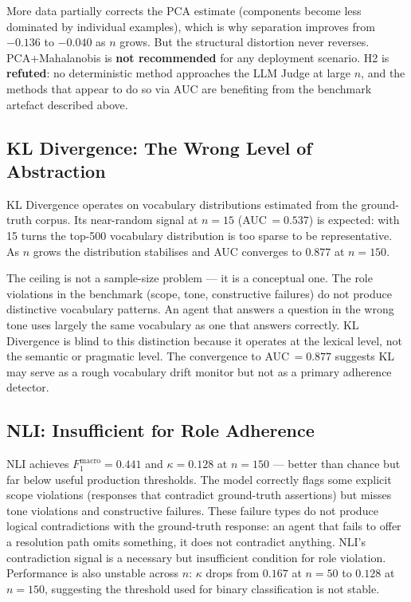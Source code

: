 \documentclass[11pt,a4paper]{article}
\begin{document}
More data partially corrects the PCA estimate (components become less dominated
by individual examples), which is why separation improves from $-0.136$ to
$-0.040$ as $n$ grows. But the structural distortion never reverses.
PCA+Mahalanobis is \textbf{not recommended} for any deployment scenario.
H2 is \textbf{refuted}: no deterministic method approaches the LLM Judge
at large $n$, and the methods that appear to do so via AUC are benefiting
from the benchmark artefact described above.

\subsection{KL Divergence: The Wrong Level of Abstraction}

KL Divergence operates on vocabulary distributions estimated from the
ground-truth corpus. Its near-random signal at $n = 15$ (AUC\,$= 0.537$)
is expected: with 15 turns the top-500 vocabulary distribution is too sparse
to be representative. As $n$ grows the distribution stabilises and AUC
converges to $0.877$ at $n = 150$.

The ceiling is not a sample-size problem --- it is a conceptual one. The role
violations in the benchmark (scope, tone, constructive failures) do not produce
distinctive vocabulary patterns. An agent that answers a question in the wrong
tone uses largely the same vocabulary as one that answers correctly. KL
Divergence is blind to this distinction because it operates at the lexical
level, not the semantic or pragmatic level. The convergence to AUC\,$= 0.877$
suggests KL may serve as a rough vocabulary drift monitor but not as a primary
adherence detector.

\subsection{NLI: Insufficient for Role Adherence}

NLI achieves $F_1^{\text{macro}} = 0.441$ and $\kappa = 0.128$ at $n = 150$
--- better than chance but far below useful production thresholds. The model
correctly flags some explicit scope violations (responses that contradict
ground-truth assertions) but misses tone violations and constructive failures.
These failure types do not produce logical contradictions with the ground-truth
response: an agent that fails to offer a resolution path omits something, it
does not contradict anything. NLI's contradiction signal is a necessary but
insufficient condition for role violation. Performance is also unstable across
$n$: $\kappa$ drops from $0.167$ at $n = 50$ to $0.128$ at $n = 150$,
suggesting the threshold used for binary classification is not stable.
\end{document}
